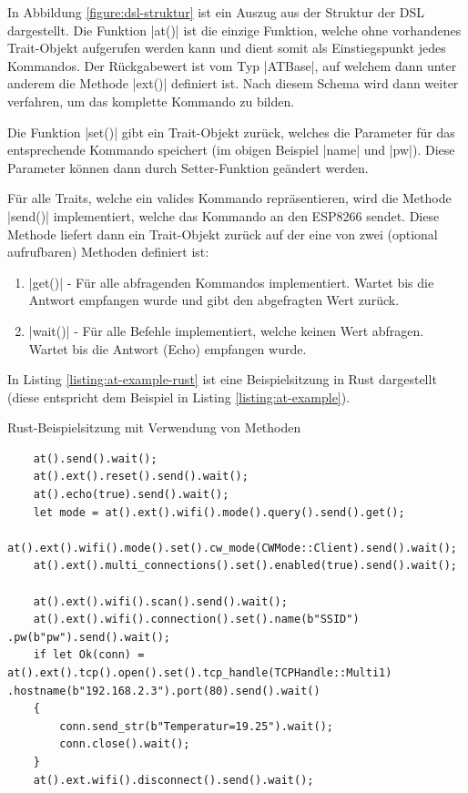 \documentclass
[ 12pt,
  parskip=half %
]{scrreprt}
\newenvironment{mylisting}[1][H]
{\captionsetup{aboveskip=-0.2\normalbaselineskip}\begin{listing}[#1]}
{\end{listing}}
\begin{document}
In Abbildung \ref{figure:dsl-struktur} ist ein Auszug aus der Struktur der DSL dargestellt. Die Funktion \rustinline|at()| ist die einzige Funktion, welche ohne vorhandenes Trait-Objekt aufgerufen werden kann und dient somit als Einstiegspunkt jedes Kommandos. Der Rückgabewert ist vom Typ \rustinline|ATBase|, auf welchem dann unter anderem die Methode \rustinline|ext()| definiert ist. Nach diesem Schema wird dann weiter verfahren, um das komplette Kommando zu bilden.

Die Funktion \rustinline|set()| gibt ein Trait-Objekt zurück, welches die Parameter für das entsprechende Kommando speichert (im obigen Beispiel \rustinline|name| und \rustinline|pw|). Diese Parameter können dann durch Setter-Funktion geändert werden.

Für alle Traits, welche ein valides Kommando repräsentieren, wird die Methode \rustinline|send()| implementiert, welche das Kommando an den ESP8266 sendet. Diese Methode liefert dann ein Trait-Objekt zurück auf der eine von zwei (optional aufrufbaren) Methoden definiert ist:
\begin{enumerate}
	\item \rustinline|get()| - Für alle abfragenden Kommandos implementiert. Wartet bis die Antwort empfangen wurde und gibt den abgefragten Wert zurück.
	\item \rustinline|wait()| - Für alle Befehle implementiert, welche keinen Wert abfragen. Wartet bis die Antwort (Echo) empfangen wurde. 
\end{enumerate}


In Listing \ref{listing:at-example-rust} ist eine Beispielsitzung in Rust dargestellt (diese entspricht dem Beispiel in Listing \ref{listing:at-example}). 

\begin{mylisting}
	\caption{Rust-Beispielsitzung mit Verwendung von Methoden}
	\label{listing:at-example-rust}
	\begin{verbatim}
	at().send().wait();
	at().ext().reset().send().wait();
	at().echo(true).send().wait();
	let mode = at().ext().wifi().mode().query().send().get();
	at().ext().wifi().mode().set().cw_mode(CWMode::Client).send().wait();
	at().ext().multi_connections().set().enabled(true).send().wait();
	
	at().ext().wifi().scan().send().wait();
	at().ext().wifi().connection().set().name(b"SSID") .pw(b"pw").send().wait();
	if let Ok(conn) = at().ext().tcp().open().set().tcp_handle(TCPHandle::Multi1) .hostname(b"192.168.2.3").port(80).send().wait() 
	{
		conn.send_str(b"Temperatur=19.25").wait();
		conn.close().wait();
	}
	at().ext.wifi().disconnect().send().wait();
	\end{verbatim}
\end{mylisting} 
\end{document}
